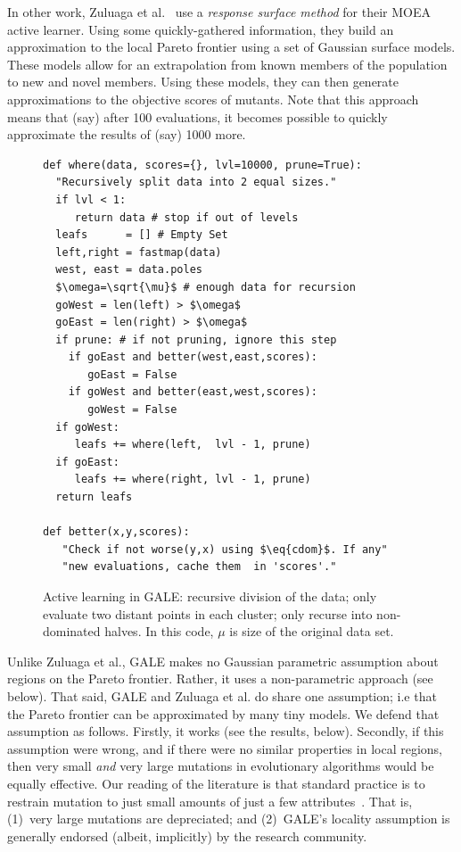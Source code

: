 \documentclass[10pt,journal,compsoc]{IEEEtran}
\newcommand{\eq}[1]{Equation~\ref{eq:#1}}
\newenvironment{changed}{\par}{\par}
\newcommand{\ADD}[1]{#1}
\begin{document}
In other work, Zuluaga et al.~\cite{Zuluaga:13} use a {\em response surface method} for their MOEA active learner.  
Using some quickly-gathered information, they build an approximation to the local Pareto frontier using a set of Gaussian surface models. 
These models allow for an extrapolation from \ADD{known members of the
population to new and novel members}.  
Using these models, they can then generate approximations to the objective scores of mutants. 
Note that this approach means that (say) after 100 evaluations, it becomes possible to quickly approximate the results of (say) 1000 more.


\begin{figure}[!b]
\begin{minipage}{3.2in}
\begin{lstlisting}[mathescape,frame=r,numbers=right]
def where(data, scores={}, lvl=10000, prune=True):  
  "Recursively split data into 2 equal sizes."
  if lvl < 1: 
     return data # stop if out of levels
  leafs      = [] # Empty Set
  left,right = fastmap(data)
  west, east = data.poles
  $\omega=\sqrt{\mu}$ # enough data for recursion
  goWest = len(left) > $\omega$  
  goEast = len(right) > $\omega$ 
  if prune: # if not pruning, ignore this step
    if goEast and better(west,east,scores): 
       goEast = False 
    if goWest and better(east,west,scores): 
       goWest = False 
  if goWest:  
     leafs += where(left,  lvl - 1, prune)  
  if goEast:  
     leafs += where(right, lvl - 1, prune) 
  return leafs

def better(x,y,scores):
   "Check if not worse(y,x) using $\eq{cdom}$. If any"
   "new evaluations, cache them  in 'scores'."
\end{lstlisting}

\caption{Active learning in GALE:
recursive division of the data;
only evaluate two distant points in each cluster;
only recurse into non-dominated halves.
In this code, $\mu$ is size of the original data set.
}
\label{fig:whereCode} 
\end{minipage}
\end{figure}


\begin{changed}
Unlike Zuluaga et al., GALE makes no Gaussian parametric assumption about regions on the Pareto frontier.  
Rather, it uses a non-parametric approach (see below).
That said, GALE and  Zuluaga et al.  do share one  assumption; i.e that the Pareto frontier can be approximated by many tiny models.
We defend that assumption as follows. 
Firstly, it works (see the results, below).
Secondly, if this assumption were wrong, and if there were no similar
properties in local regions, then very small {\em and} very large mutations in  evolutionary algorithms would be equally effective. 
Our reading of the literature is that standard practice  is to restrain mutation to just small amounts of just a few attributes~\cite{goldberg00}.
That is, (1)~very large mutations are depreciated; and (2)~GALE's locality assumption is  generally  endorsed (albeit, implicitly)  by the research community.
\end{changed}
\end{document}
